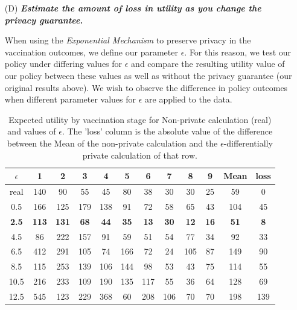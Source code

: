 \documentclass{article}
\begin{document}
\begin{itemize}
\item[(D)] \textbf{\textit{Estimate the amount of loss in utility as you change the privacy guarantee.}}

When using the \textit{Exponential Mechanism} to preserve privacy in the vaccination outcomes, we define our parameter $\epsilon$. For this reason, we test our policy under differing values for $\epsilon$ and compare the resulting utility value of our policy between these values as well as without the privacy guarantee (our original results above). We wish to observe the difference in policy outcomes when different parameter values for $\epsilon$ are applied to the data.


\begin{table}[hbpt]
\centering
\begin{tabular}{||c || c | c | c | c | c | c | c | c | c | c || c ||} 
\hline
 $\epsilon$ & \textbf{1} & \textbf{2} & \textbf{3} & \textbf{4}  & \textbf{5} & \textbf{6} & \textbf{7} & \textbf{8} & \textbf{9} & \textbf{Mean} & \textbf{loss} \\[0.5ex] 
 \hline\hline
 real & 140 & 90 & 55 & 45 & 80 & 38 & 30 & 30 & 25 & 59 & 0\\
 \hline
 0.5 & 166 & 125 & 179 & 138 & 91 & 72 & 58 & 65 & 43 & 104 & 45\\
 \hline
 \textbf{2.5} & \textbf{113} & \textbf{131} & \textbf{68} & \textbf{44} & \textbf{35} & \textbf{13} & \textbf{30} & \textbf{12} & \textbf{16} & \textbf{51} & \textbf{8}\\ 
 \hline
 4.5 & 86 & 222 & 157 & 91 & 59 & 51 & 54 & 77 & 34 & 92 & 33\\ 
 \hline
 6.5 & 412 & 291 & 105 & 74 & 166 & 72 & 24 & 105 & 87 & 149 & 90\\
 \hline
 8.5 & 115 & 253 & 139 & 106 & 144 & 98 & 53 & 43 & 75 & 114 & 55\\
 \hline
 10.5 & 216 & 233 & 109 & 190 & 135 & 117 & 55 & 36 & 64 & 128 & 69\\
 \hline
 12.5 & 545 & 123 & 229 & 368 & 60 & 208 & 106 & 70 & 70 & 198 & 139\\ [1ex] 
 \hline
\end{tabular}
\label{tab:utility-differences}
\caption{Expected utility by vaccination stage for Non-private calculation (real) and values of $\epsilon$. The 'loss' column is the absolute value of the difference between the Mean of the non-private calculation and the $\epsilon$-differentially private calculation of that row.}
\end{table}


\end{itemize}
\end{document}
